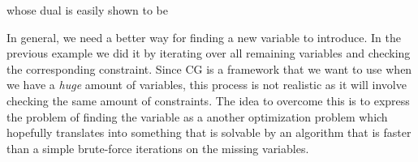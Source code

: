 \begin{center}
\end{center}

whose dual is easily shown to be

\begin{center}
\end{center}

In general, we need a better way
for finding a new variable to introduce. In the previous example we did it by iterating over all remaining variables
and checking the corresponding constraint. Since CG is a framework that we want to use when we have a \emph{huge} amount of 
variables, this process is not realistic as it will involve checking the same amount of constraints. The idea to overcome this
is to express the problem of finding the variable as a another optimization problem which hopefully translates into something
that is solvable by an algorithm that is faster than a simple brute-force iterations on the missing variables.

